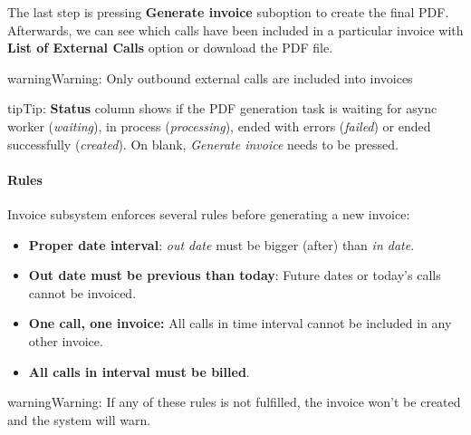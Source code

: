 \documentclass[letterpaper,10pt,english]{sphinxmanual}
\begin{document}
The last step is pressing \textbf{Generate invoice} suboption to create the final PDF. Afterwards, we can see which calls have been
included in a particular invoice with \textbf{List of External Calls} option or download the PDF file.

\begin{notice}{warning}{Warning:}
Only outbound external calls are included into invoices
\end{notice}

\begin{notice}{tip}{Tip:}
\textbf{Status} column shows if the PDF generation task is waiting for async worker (\emph{waiting}), in process (\emph{processing}),
ended with errors (\emph{failed}) or ended successfully (\emph{created}). On blank, \emph{Generate invoice} needs to be pressed.
\end{notice}


\paragraph{Rules}
\label{administration_portal/brand/invoicing/invoices:rules}
Invoice subsystem enforces several rules before generating a new invoice:
\begin{itemize}
\item {} 
\textbf{Proper date interval}: \emph{out date} must be bigger (after) than \emph{in date}.

\item {} 
\textbf{Out date must be previous than today}: Future dates or today's calls cannot be invoiced.

\item {} 
\textbf{One call, one invoice:} All calls in time interval cannot be included in any other invoice.

\item {} 
\textbf{All calls in interval must be billed}.

\end{itemize}

\begin{notice}{warning}{Warning:}
If any of these rules is not fulfilled, the invoice won't be created and the system will warn.
\end{notice}
\end{document}
